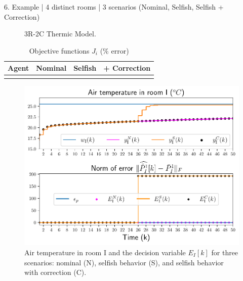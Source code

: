 \documentclass[presentation]{beamer}
\begin{document}
\begin{frame}
\begin{textblock}{15.6}
\begin{block}{6. Example | 4 distinct rooms | 3 scenarios (Nominal, Selfish, Selfish + Correction) }
\begin{minipage}[c]{27cm}
\begin{figure}[h]
\begin{tikzpicture}[european]
          \end{tikzpicture}
          \caption{3R-2C Thermic Model.}
        \end{figure}
        \begin{table}[h]
          \caption{Objective functions $J_{i}$ (\% error)}\label{tab:costsGlobalLocal}
          \begin{tabular}[t]{cccc}
            \toprule
            Agent  & Nominal & Selfish & + Correction\\
            \midrule
            \\
            \bottomrule
          \end{tabular}
        \end{table}
      \end{minipage}
      \hfill
      \begin{minipage}[c]{26cm}
        \begin{figure}[h]
          \includegraphics[width=\textwidth]{../img/airtemp_roomI/__ErrorWX_command_normErrH_poster.pdf}
          \caption{\centering Air temperature in room I and the decision variable $E_{I}[k]$ for three scenarios: nominal (N), selfish behavior (S),
            and selfish behavior with correction (C).}\label{fig:response3Scenarios}
        \end{figure}
      \end{minipage}
      \hfill
      \begin{minipage}[c]{26cm}
        \begin{figure}[h]

\end{figure}
\end{minipage}
\end{block}
\end{textblock}
\end{frame}
\end{document}
